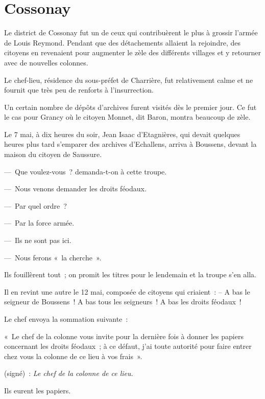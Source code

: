 \documentclass[french,twoside]{book} %
\newenvironment{quoteblock}%
  {\begin{quoting}}
  {\end{quoting}}
\newenvironment{quotebar}{%
    \def\FrameCommand{{\color{rubric!10!}\vrule width 0.5em} \hspace{0.9em}}%
    \def\OuterFrameSep{\itemsep} %
    \MakeFramed {\advance\hsize-\width \FrameRestore}
  }%
  {%
    \endMakeFramed
  }
\renewenvironment{quoteblock}%
  {%
    \savenotes
    \setstretch{0.9}
    \normalfont
    \begin{quotebar}
  }
  {%
    \end{quotebar}
    \spewnotes
  }
\begin{document}
\section[Cossonay]{Cossonay}
\noindent Le district de Cossonay fut un de ceux qui contribuèrent le plus à grossir l’armée de Louis Reymond. Pendant que des détachements allaient la rejoindre, des citoyens en revenaient pour augmenter le zèle des différents villages et y retourner avec de nouvelles colonnes.\par
Le chef-lieu, résidence du sous-préfet de Charrière, fut relativement calme et ne fournit que très peu de renforts à l’insurrection.\par
Un certain nombre de dépôts d’archives furent visités dès le premier jour. Ce fut le cas pour Grancy où le citoyen Monnet, dit Baron, montra beaucoup de zèle.\par
Le 7 mai, à dix heures du soir, Jean Isaac d’Etagnières, qui devait quelques heures plus tard s’emparer des archives d’Echallens, arriva à Boussens, devant la maison du citoyen de Saussure.\par
— Que voulez-vous ? demanda-t-on à cette troupe.\par
— Nous venons demander les droits féodaux.\par
— Par quel ordre ?\par
— Par la force armée.\par
— Ils ne sont pas ici.\par
— Nous ferons « la cherche ».\par
Ils fouillèrent tout ; on promit les titres pour le lendemain et la troupe s’en alla.\par
Il en revint une autre le 12 mai, composée de citoyens qui criaient : – A bas le seigneur de Boussens ! A bas tous les seigneurs ! A bas les droits féodaux !\par
Le chef envoya la sommation suivante :\par

\begin{quoteblock}
 \noindent « Le chef de la colonne vous invite pour la dernière fois à donner les papiers concernant les droits féodaux ; à ce défaut, j’ai toute autorité pour faire entrer chez vous la colonne de ce lieu à vos frais ».\par
 (signé) : \emph{Le chef de la colonne de ce lieu.}
 \end{quoteblock}

\noindent Ils eurent les papiers.\par
\end{document}
